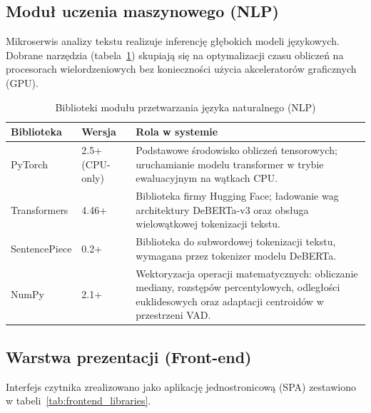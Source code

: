\subsection{Moduł uczenia maszynowego (NLP)}
Mikroserwis analizy tekstu realizuje inferencję głębokich modeli językowych. Dobrane narzędzia (tabela~\ref{tab:nlp_libraries}) skupiają się na optymalizacji czasu obliczeń na
procesorach wielordzeniowych bez konieczności użycia akceleratorów graficznych (GPU).

\begin{table}[htbp]
    \centering
    \caption{Biblioteki modułu przetwarzania języka naturalnego (NLP)}
    \label{tab:nlp_libraries}
    \begin{tabularx}{\textwidth}{l l X}
        \toprule
        \textbf{Biblioteka} & \textbf{Wersja} & \textbf{Rola w systemie} \\
        \midrule
        PyTorch & 2.5+ (CPU-only) & Podstawowe środowisko obliczeń tensorowych; uruchamianie modelu transformer w trybie ewaluacyjnym na wątkach CPU. \\
        Transformers & 4.46+ & Biblioteka firmy Hugging Face; ładowanie wag architektury DeBERTa-v3 oraz obsługa wielowątkowej tokenizacji tekstu. \\
        SentencePiece & 0.2+ & Biblioteka do subwordowej tokenizacji tekstu, wymagana przez tokenizer modelu DeBERTa. \\
        NumPy & 2.1+ & Wektoryzacja operacji matematycznych: obliczanie mediany, rozstępów percentylowych, odległości euklidesowych oraz adaptacji centroidów w przestrzeni
        VAD. \\
        \bottomrule
    \end{tabularx}
\end{table}

\subsection{Warstwa prezentacji (Front-end)}
Interfejs czytnika zrealizowano jako aplikację jednostronicową (SPA) zestawiono w 
tabeli~\ref{tab:frontend_libraries}.

